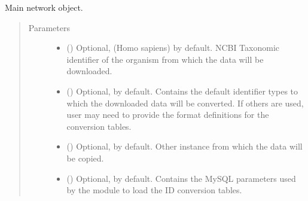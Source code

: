 \documentclass[letterpaper,10pt,english]{sphinxmanual}
\begin{document}
\begin{fulllineitems}
\label{\detokenize{main:pypath.main.PyPath}}
Main network object.
\begin{quote}\begin{description}
\item[{Parameters}] \leavevmode\begin{itemize}
\item {} 
 () \textendash{} Optional,  (Homo sapiens) by default. NCBI Taxonomic
identifier of the organism from which the data will be
downloaded.

\item {} 
 () \textendash{} Optional,  by default. Contains
the default identifier types to which the downloaded data will
be converted. If others are used, user may need to provide the
format definitions for the conversion tables.

\item {} 
 ({\hyperref[\detokenize{main:pypath.main.PyPath}]{}}) \textendash{} Optional,  by default. Other
{\hyperref[\detokenize{main:pypath.main.PyPath}]{}} instance from which the data will
be copied.

\item {} 
 () \textendash{} Optional,  by default. Contains the MySQL
parameters used by the  module to load
the ID conversion tables.


\end{itemize}
\end{description}
\end{quote}
\end{fulllineitems}
\end{document}

